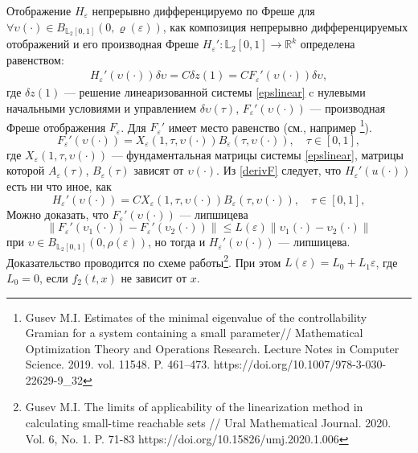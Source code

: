 \documentclass[../main.tex]{subfiles}
\begin{document}
	Отображение $ H_{\varepsilon} $ непрерывно дифференцируемо по Фреше для $ \forall \upsilon(\cdot) \in  B_{\mathbb{L}_2[0,1]}(0,\varrho(\varepsilon)) $, как композиция непрерывно дифференцируемых отображений и его производная Фреше $ H_{\varepsilon}': \mathbb{L}_2[0,1]  \rightarrow  \mathbb{R}^k $ определена равенством:
	\begin{gather*}
		H_{\varepsilon}'( \upsilon(\cdot))\delta \upsilon = C \delta z(1) = C F_{\varepsilon}'(\upsilon(\cdot))\delta  \upsilon,
	\end{gather*}
	где $ \delta z(1) $ --- решение линеаризованной системы \eqref{epslinear} c нулевыми начальными условиями и управлением $  \delta  \upsilon(\tau) $, $ F_{\varepsilon}'( \upsilon(\cdot)) $ --- производная Фреше отображения $ F _{\varepsilon}$.
	Для $ F_{\varepsilon}' $ имеет место равенство (см., например \footnote{Gusev M.I. Estimates of the minimal eigenvalue of the controllability Gramian for a system containing a small parameter//  Mathematical Optimization Theory and Operations Research. Lecture Notes in Computer Science. 2019. vol. 11548. P. 461--473.  https://doi.org/10.1007/978-3-030-22629-9\_32}).
	\begin{equation}\label{derivF}
		F_{\varepsilon}'( \upsilon(\cdot)) = X_{\varepsilon}(1,\tau, \upsilon(\cdot))B_{\varepsilon} (\tau, \upsilon(\cdot)), \quad \tau\in[0,1],
	\end{equation}
	где $ X_{\varepsilon}(1,\tau,\upsilon(\cdot)) $ --- фундаментальная матрицы системы \eqref{epslinear}, матрицы которой $ A_{\varepsilon}(\tau) $, $ B_{\varepsilon}(\tau)  $ зависят от $ \upsilon(\cdot) $.
	Из \eqref{derivF} следует, что $ H_{\varepsilon}'(u(\cdot)) $ есть ни что иное, как
	\begin{equation*}
		H_{\varepsilon}'(\upsilon(\cdot)) = C X_{\varepsilon}(1,\tau, \upsilon(\cdot))B_{\varepsilon} (\tau, \upsilon(\cdot)), \quad \tau\in[0,1],
	\end{equation*}
	Можно доказать, что $ F_{\varepsilon}'(\upsilon(\cdot)) $ --- липшицева
	\begin{equation}\label{lipdF}
		\left\| F_{\varepsilon}'(\upsilon_1(\cdot)) - F_{\varepsilon}'(\upsilon_2(\cdot)) \right\| \leqslant L(\varepsilon) \left\| \upsilon_1(\cdot) - \upsilon_2(\cdot)\right\|
	\end{equation}
	при $ \upsilon \in B_{\mathbb{L}_2[0,1]}(0,\rho(\varepsilon))  $, но тогда и $ H_{\varepsilon}'(\upsilon(\cdot)) $ --- липшицева. Доказательство проводится по схеме работы\footnote{Gusev M.I. The limits of applicability of the linearization method in calculating small-time reachable sets // Ural Mathematical Journal. 2020. Vol. 6, No. 1. P. 71-83 https://doi.org/10.15826/umj.2020.1.006}.  При этом $ L(\varepsilon) = L_0 + L_1 \varepsilon $, где $ L_0 = 0$, если $ f_2(t,x)  $ не зависит от $ x $.
\end{document}
